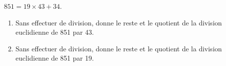 
$851 = 19 \times 43 + 34 $. 
\begin{enumerate}
\item Sans effectuer de division, donne le reste et le quotient de la division euclidienne de 851 par 43.
\item Sans effectuer de division, donne le reste et le quotient de la division euclidienne de 851 par 19. 
\end{enumerate}